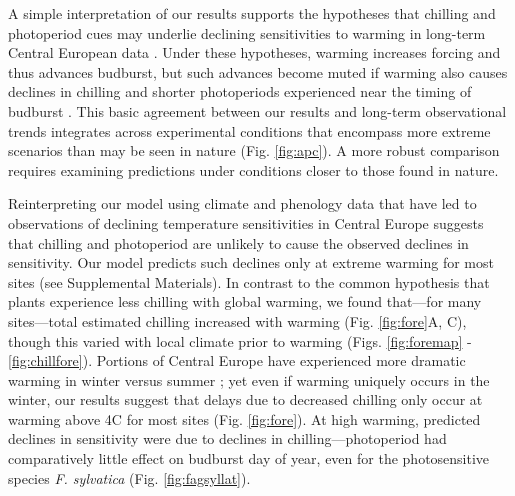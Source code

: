 \documentclass{article}
\begin{document}
\par A simple interpretation of our results supports the hypotheses that chilling and photoperiod cues may underlie declining sensitivities to warming in long-term Central European data \emph{\citep{fu2015,Rutishauser:2008,yu2010}}. Under these hypotheses, warming increases forcing and thus advances budburst, but such advances become muted if warming also causes declines in chilling and shorter photoperiods experienced near the timing of budburst 
\emph{\citep{koerner2010a}}.
This basic agreement between our results and long-term observational trends integrates across experimental conditions that encompass more extreme scenarios than may be seen in nature (Fig. \ref{fig:apc}). A more robust comparison requires examining predictions under conditions closer to those found in nature.


\par Reinterpreting our model using climate and phenology data that have led to observations of declining temperature sensitivities in Central Europe suggests that chilling and photoperiod are unlikely to cause the observed declines in sensitivity. Our model predicts such declines only at extreme warming for most sites (see Supplemental Materials). In contrast to the common hypothesis that plants experience less chilling with global warming, we found that---for many sites---total estimated chilling increased with warming (Fig. \ref{fig:fore}A, C), though this varied with local climate prior to warming (Figs. \ref{fig:foremap} - \ref{fig:chillfore}). 
Portions of Central Europe have experienced more dramatic warming in winter versus summer \emph{\citep{balling1998}}; yet even if warming uniquely occurs in the winter, our results suggest that delays due to decreased chilling only occur at warming above 4\degree C for most sites (Fig. \ref{fig:fore}). At high warming, predicted declines in sensitivity were due to declines in chilling---photoperiod had comparatively little effect on budburst day of year, even for the photosensitive species \emph{F. sylvatica} (Fig. \ref{fig:fagsyllat}). 
\end{document}
